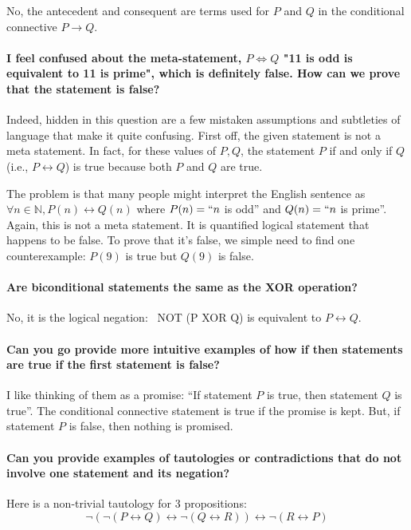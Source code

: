 \documentclass[10pt,english]{article}
\begin{document}
No, the antecedent and consequent are terms used for $P$ and $Q$ in the conditional connective $P \rightarrow Q$.

\paragraph{I feel confused about the meta-statement, $P \Leftrightarrow Q$ "11 is odd is equivalent to 11 is prime", which is definitely false. How can we prove that the statement is false?}

Indeed, hidden in this question are a few mistaken assumptions and subtleties of language that make it quite confusing.  First off, the given statement is not a meta statement.  In fact, for these values of $P,Q$, the statement $P$ if and only if $Q$ (i.e., $P \leftrightarrow Q$) is true because both $P$ and $Q$ are true.

The problem is that many people might interpret the English sentence as $\forall n\in \mathbb{N}, P(n) \leftrightarrow Q(n)$ where $P(n)=``n$ is odd'' and $Q(n)=``n$ is prime''.  Again, this is not a meta statement.  It is quantified logical statement that happens to be false.  To prove that it's false, we simple need to find one counterexample: $P(9)$ is true but $Q(9)$ is false.



\paragraph{Are biconditional statements the same as the XOR operation?}

No, it is the logical negation:  NOT (P XOR Q) is equivalent to $P \leftrightarrow Q$.

\paragraph{Can you go provide more intuitive examples of how if then statements are true if the first statement is false?}

I like thinking of them as a promise: ``If statement $P$ is true, then statement $Q$ is true''.  The conditional connective statement is true if the promise is kept. But, if statement $P$ is false, then nothing is promised.

\paragraph{Can you provide examples of tautologies or contradictions that do not involve one statement and its negation?}

Here is a non-trivial tautology for 3 propositions: \[ \neg( \neg (P \leftrightarrow Q)  \leftrightarrow \neg (Q \leftrightarrow R) ) \leftrightarrow \neg (R \leftrightarrow P) \]

    
\end{document}
